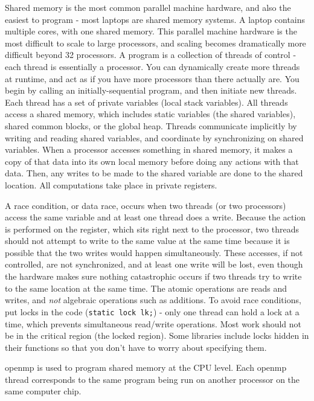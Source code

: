 \documentclass[10pt]{article}
\begin{document}
\begin{flushleft}
Shared memory is the most common parallel machine hardware, and also the easiest to program - most laptops are shared memory systems. A laptop contains multiple cores, with one shared memory. This parallel machine hardware is the most difficult to scale to large processors, and scaling becomes dramatically more difficult beyond 32 processors. A program is a collection of threads of control - each thread is essentially a processor. You can dynamically create more threads at runtime, and act as if you have more processors than there actually are. You begin by calling an initially-sequential program, and then initiate new threads. Each thread has a set of private variables (local stack variables). All threads access a shared memory, which includes static variables (the shared variables), shared common blocks, or the global heap. Threads communicate implicitly by writing and reading shared variables, and coordinate by synchronizing on shared variables. When a processor accesses something in shared memory, it makes a copy of that data into its own local memory before doing any actions with that data. Then, any writes to be made to the shared variable are done to the shared location. All computations take place in private registers.

A race condition, or data race, occurs when two threads (or two processors) access the same variable and at least one thread does a write. Because the action is performed on the register, which sits right next to the processor, two threads should not attempt to write to the same value at the same time because it is possible that the two writes would happen simultaneously. These accesses, if not controlled, are not synchronized, and at least one write will be lost, even though the hardware makes sure nothing catastrophic occurs if two threads try to write to the same location at the same time. The atomic operations are reads and writes, and \textit{not} algebraic operations such as additions. To avoid race conditions, put locks in the code ({\tt static lock lk;}) - only one thread can hold a lock at a time, which prevents simultaneous read/write operations. Most work should not be in the critical region (the locked region). Some libraries include locks hidden in their functions so that you don't have to worry about specifying them.

\gls{openmp} is used to program shared memory at the CPU level. Each \gls{openmp} thread corresponds to the same program being run on another processor on the same computer chip.


\end{flushleft}
\end{document}
